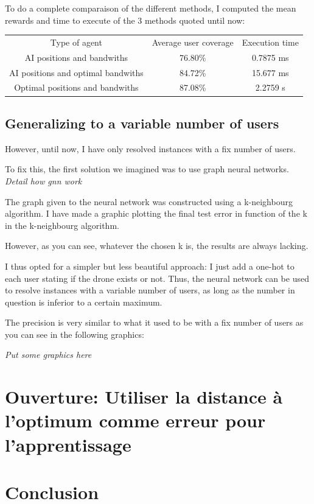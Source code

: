 \documentclass[letterpaper]{article}
\begin{document}
To do a complete comparaison of the different methods, I computed the mean rewards and time to execute of the 3 methods quoted until now:

\begin{center}
    \begin{tabular}{ c c c }
     Type of agent & Average user coverage & Execution time \\ 
     AI positions and bandwiths & 76.80\% & 0.7875 ms \\  
     AI positions and optimal bandwiths & 84.72\% & 15.677 ms  \\
     Optimal positions and bandwiths &  87.08\% & 2.2759 s 
    \end{tabular}
    \end{center}

\subsection{Generalizing to a variable number of users}

However, until now, I have only resolved instances with a fix number of users.

To fix this, the first solution we imagined was to use graph neural networks.
\textit{Detail how gnn work}

The graph given to the neural network was constructed using a k-neighbourg algorithm.
I have made a graphic plotting the final test error in function of the k in the k-neighbourg algorithm.

However, as you can see, whatever the chosen k is, the results are always lacking.

I thus opted for a simpler but less beautiful approach: I just add a one-hot to each user stating if the drone exists or not.
Thus, the neural network can be used to resolve instances with a variable number of users, as long as the number in question is inferior to a certain maximum.

The precision is very similar to what it used to be with a fix number of users as you can see in the following graphics:

\textit{Put some graphics here}

\section{Ouverture: Utiliser la distance à l'optimum comme erreur pour l'apprentissage}

\section{Conclusion}
\end{document}
